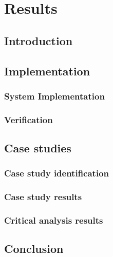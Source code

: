 \chapter{Results}
\label{chap:3}

\section{Introduction}

\section{Implementation}

\subsection{System Implementation}

\subsection{Verification}

\section{Case studies}

\subsection{Case study identification}

\subsection{Case study results}

\subsection{Critical analysis results}

\section{Conclusion}
